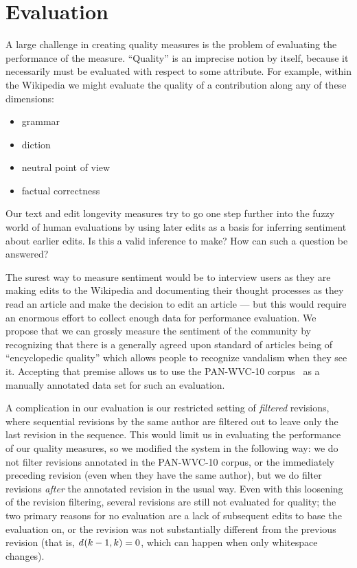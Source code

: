 \section{Evaluation}

A large challenge in creating quality measures is the
problem of evaluating the performance of the measure.
``Quality'' is an imprecise notion by itself, because it
necessarily must be evaluated with respect to some attribute.
For example, within the Wikipedia we might evaluate the quality
of a contribution along any of these dimensions:
\begin{itemize}
\item grammar
\item diction
\item neutral point of view
\item factual correctness
\end{itemize}
Our text and edit longevity measures try to go one step
further into the fuzzy world of human evaluations by using
later edits as a basis for inferring sentiment about earlier edits.
Is this a valid inference to make?
How can such a question be answered?

The surest way to measure sentiment would be to interview
users as they are making edits to the Wikipedia and documenting
their thought processes as they read an article and make the
decision to edit an article --- but this would require an enormous
effort to collect enough data for performance evaluation.
We propose that we can grossly measure the sentiment of the
community by recognizing that there is a generally agreed upon
standard of articles being of ``encyclopedic quality''
which allows people to recognize vandalism when they see it.
Accepting that premise allows us to use the PAN-WVC-10
corpus~\cite{Potthast2010a} as a manually annotated data set for
such an evaluation.

A complication in our evaluation is our restricted setting of
\textit{filtered} revisions, where sequential revisions by the
same author are filtered out to leave only the last revision
in the sequence.
This would limit us in evaluating the performance of our
quality measures, so we modified the system in the following way:
we do not filter revisions annotated in the PAN-WVC-10 corpus,
or the immediately preceding revision (even when they have the
same author), but we do filter revisions \textit{after} the annotated
revision in the usual way.
Even with this loosening of the revision filtering, several
revisions are still not evaluated for quality; the two
primary reasons for no evaluation are a lack of subsequent
edits to base the evaluation on, or the revision was not
substantially different from the previous revision
(that is, $d_{}(k-1,k) = 0$, which can happen when only
whitespace changes).

